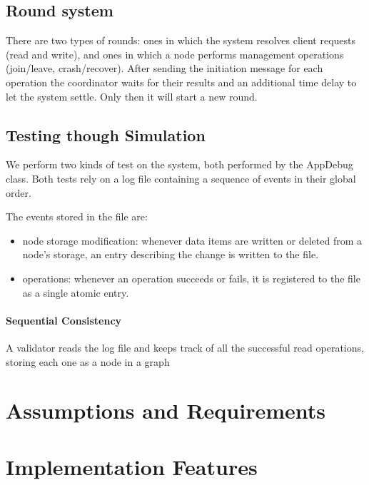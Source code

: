 \documentclass{article}
\begin{document}
\subsection{Round system}
There are two types of rounds: ones in which the system resolves client requests (read and write), and ones in which a node performs management operations (join/leave, crash/recover).
After sending the initiation message for each operation the coordinator waits for their results and an additional time delay to let the system settle. Only then it will start a new round.

\subsection{Testing though Simulation}
We perform two kinds of test on the system, both performed by the AppDebug class. Both tests rely on a log file containing a sequence of events in their global order.

The events stored in the file are:
\begin{itemize}
    \item node storage modification: whenever data items are written or deleted from a node's storage, an entry describing the change is written to the file.
    \item operations: whenever an operation succeeds or fails, it is registered to the file as a single atomic entry.
\end{itemize}

\paragraph {Sequential Consistency}
A validator reads the log file and keeps track of all the successful read operations, storing each one as a node in a graph


\section{Assumptions and Requirements}

\section{Implementation Features}
\end{document}
